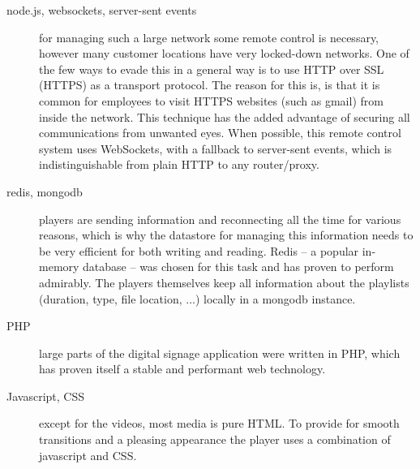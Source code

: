 \documentclass[]{friggeri-cv}
\begin{document}
\begin{entrylist}
{{\begin{description}
        \item[node.js, websockets, server-sent events] for managing such a large network some remote control is necessary, however many customer locations have very locked-down networks. One of the few ways to evade this in a general way is to use HTTP over SSL (HTTPS) as a transport protocol. The reason for this is, is that it is common for employees to visit HTTPS websites (such as gmail) from inside the network. This technique has the added advantage of securing all communications from unwanted eyes. When possible, this remote control system uses WebSockets, with a fallback to server-sent events, which is indistinguishable from plain HTTP to any router/proxy.
        \item[redis, mongodb] players are sending information and reconnecting all the time for various reasons, which is why the datastore for managing this information needs to be very efficient for both writing and reading. Redis -- a popular in-memory database -- was chosen for this task and has proven to perform admirably. The players themselves keep all information about the playlists (duration, type, file location, ...) locally in a mongodb instance.
        \item[PHP] large parts of the digital signage application were written in PHP, which has proven itself a stable and performant web technology.
        \item[Javascript, CSS] except for the videos, most media is pure HTML. To provide for smooth transitions and a pleasing appearance the player uses a combination of javascript and CSS.
    \end{description}
    }}
\end{entrylist}


\end{document}
